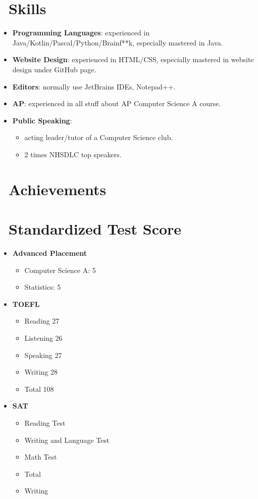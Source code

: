 \documentclass{resume}
\begin{document}
{\section{\faCogs\ Skills}
\begin{itemize}[parsep=0.5ex]
  \item \textbf{Programming Languages}:
    experienced in Java/Kotlin/Pascal/Python/Brainf**k, especially mastered in Java.
  \item \textbf{Website Design}:
	experienced in HTML/CSS, especially mastered in website design under GitHub page.
  \item \textbf{Editors}:
    normally use JetBrains IDEs, Notepad++.
  \item \textbf{AP}:
    experienced in all stuff about AP Computer Science A course.
  \item \textbf{Public Speaking}:
	\begin{itemize}[parsep=0.5ex]
	  \item acting leader/tutor of a Computer Science club.
	  \item 2 times NHSDLC top speakers.
	\end{itemize}
\end{itemize}

\section{\faHeartO\ Achievements}

\section{\faUsers\ Standardized Test Score}
\begin{itemize}[parsep=0.5ex]
  \item \textbf{Advanced Placement}
	  \begin{itemize}[parsep=0.5ex]
		  \item Computer Science A: 5
		  \item Statistics: 5
	  \end{itemize}
  \item \textbf{TOEFL}
		\begin{itemize}[parsep=0.5ex]
		  \item Reading 27
		  \item Listening 26
		  \item Speaking 27
		  \item Writing 28
		  \item Total 108
	  \end{itemize}
  \item \textbf{SAT}
		\begin{itemize}[parsep=0.5ex]
		  \item Reading Test
		  \item Writing and Language Test
		  \item Math Test
		  \item Total
		  \item Writing
	  \end{itemize}
\end{itemize}	

}
\end{document}
